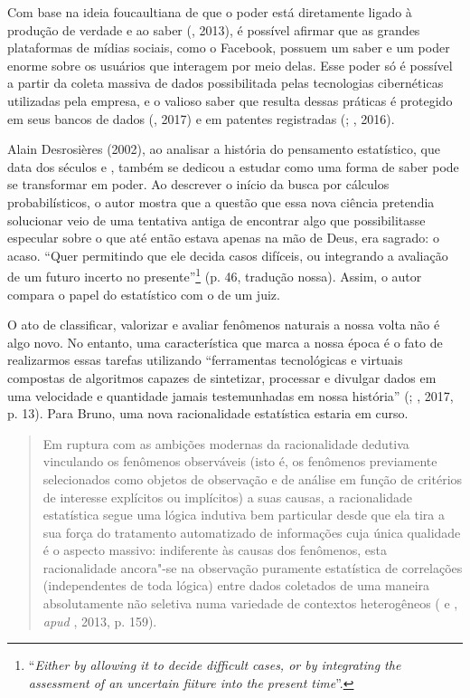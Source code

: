 Com base na ideia foucaultiana de que o poder está diretamente ligado à
produção de verdade e ao saber (, 2013),
é possível afirmar que as grandes plataformas de mídias sociais, como o
Facebook, possuem um saber e um poder enorme sobre os usuários que
interagem por meio delas. Esse poder só é possível a partir da coleta
massiva de dados possibilitada pelas tecnologias cibernéticas utilizadas
pela empresa, e o valioso saber que resulta dessas práticas é protegido
em seus bancos de dados (, 2017) e em patentes registradas
(; , 2016).

Alain Desrosières (2002), ao analisar a história do pensamento estatístico, que data dos séculos
 e , também se dedicou a estudar como uma forma de saber pode
se transformar em poder. Ao descrever o início da busca por cálculos
probabilísticos, o autor mostra que a questão que essa nova ciência
pretendia solucionar veio de uma tentativa antiga de encontrar algo que
possibilitasse especular sobre o que até então estava apenas na mão de
Deus, era sagrado: o acaso. ``Quer permitindo que ele decida casos
difíceis, ou integrando a avaliação de um futuro incerto no
presente''\footnote{``\emph{Either by allowing it to decide difficult cases,
  or by integrating the assessment of an uncertain fiiture into the
  present time}''.} (p. 46, tradução nossa). Assim, o autor compara o papel
do estatístico com o de um juiz.

O ato de classificar, valorizar e avaliar fenômenos naturais a nossa
volta não é algo novo. No entanto, uma característica que marca a nossa
época é o fato de realizarmos essas tarefas utilizando ``ferramentas
tecnológicas e virtuais compostas de algoritmos capazes de sintetizar,
processar e divulgar dados em uma velocidade e quantidade jamais
testemunhadas em nossa história'' (; , 2017, p. 13). Para Bruno, uma nova racionalidade estatística estaria em curso.

\begin{quote}
Em ruptura com as ambições modernas da racionalidade dedutiva vinculando
os fenômenos observáveis (isto é, os fenômenos previamente selecionados
como objetos de observação e de análise em função de critérios de
interesse explícitos ou implícitos) a suas causas, a racionalidade
estatística segue uma lógica indutiva bem particular desde que ela tira
a sua força do tratamento automatizado de informações cuja única
qualidade é o aspecto massivo: indiferente às causas dos fenômenos, esta
racionalidade ancora"-se na observação puramente estatística de
correlações (independentes de toda lógica) entre dados coletados de uma
maneira absolutamente não seletiva numa variedade de contextos
heterogêneos ( e , \emph{apud} , 2013, p. 159).
\end{quote}

